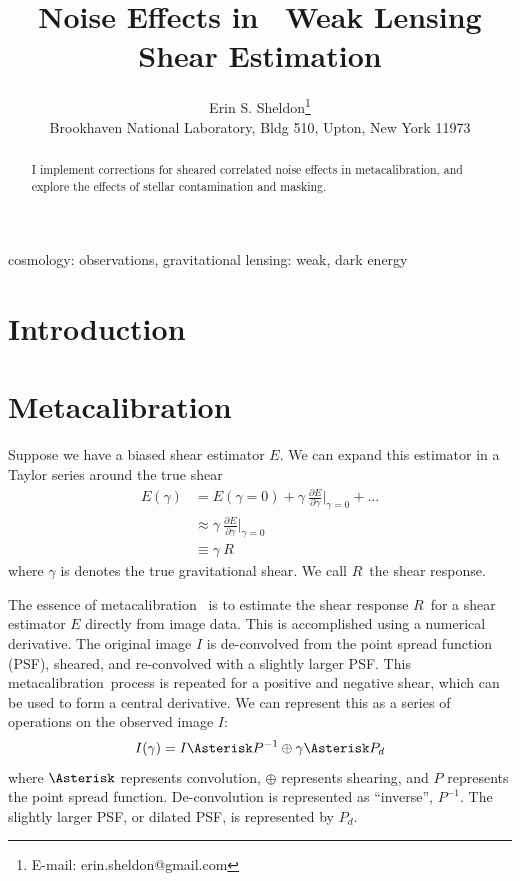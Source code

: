 \documentclass[usegraphicx,usenatbib]{mn2e}
\title{Noise Effects in \Mcal\ Weak Lensing Shear Estimation}
\author[Erin S. Sheldon]{Erin S. Sheldon\thanks{E-mail: erin.sheldon@gmail.com}\\
Brookhaven National Laboratory, Bldg 510, Upton, New York 11973}
\newcommand{\mcal}{metacalibration}
\newcommand{\mcalR}{$R$}
\begin{document}
\maketitle

\begin{abstract}

I implement corrections for sheared correlated noise effects in \mcal, and
explore the effects of stellar contamination and masking.   

\end{abstract}


\begin{keywords}                                                                    
    cosmology: observations,
    gravitational lensing: weak,
    dark energy
\end{keywords} 

\section{Introduction} \label{sec:intro}

\section{Metacalibration} \label{sec:algo}

Suppose we have a biased shear estimator $E$.  We can expand this estimator
in a Taylor series around the true shear
\begin{align}
    E(\gamma) &= E(\gamma=0) + \gamma ~ \frac{ \partial E }{ \partial \gamma }\bigg|_{\gamma=0}  + ... \nonumber \\
      & \approx  \gamma ~ \frac{ \partial E }{ \partial \gamma } \bigg|_{\gamma=0}  \\
      & \equiv  \gamma ~ \mbox{\mcalR} \nonumber
\end{align}
where $\gamma$ is denotes the true gravitational shear.  We call \mcalR\
the shear response.

The essence of \mcal\ \citep{HuffMcal} is to estimate the shear response
\mcalR\ for a shear estimator $E$ directly from image data.  This is
accomplished using a numerical derivative.  The original image $I$ is
de-convolved from the point spread function (PSF), sheared, and re-convolved
with a slightly larger PSF.  This \mcal\ process is repeated for a
positive and negative shear, which can be used to form a central derivative.
We can represent this as a series of operations on the observed image $I$:
\begin{equation}
    I(\gamma) = I \Asterisk P^{-1} \oplus \gamma \Asterisk P_{d}
\end{equation}
where $\Asterisk$ represents convolution, $\oplus$ represents shearing,
and $P$ represents the point spread function.  De-convolution
is represented as ``inverse'', $P^{-1}$.  The slightly larger PSF, or
dilated PSF, is represented by $P_{d}$.
\end{document}
